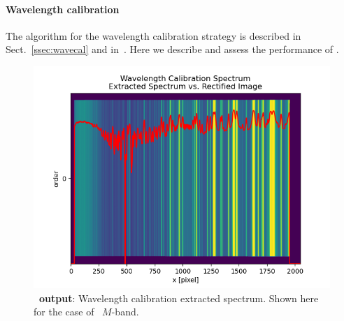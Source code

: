 \paragraph{Wavelength calibration}\label{sec:critalg_wavecal}

The algorithm for the wavelength calibration strategy is described in Sect.~\ref{ssec:wavecal} and in~\cite{pis02, pis21}. Here we describe and assess the performance of \pyred. 




\begin{figure}[!ht]
  \centering
  \includegraphics[width=\textwidth]{figures/LSS_CrtAlg_files/Figure_12.png}
  \caption[Pyreduce wavelength calibration]{\textbf{\pyred~output}: Wavelength calibration extracted spectrum. Shown here for the case of \lss~$M$-band.}
  \label{fig:fig9}
\end{figure}

